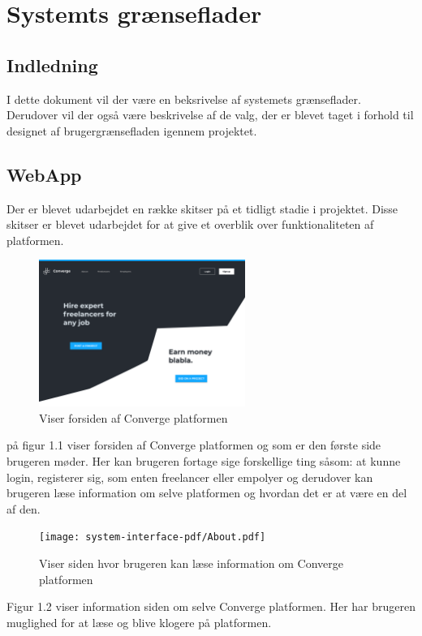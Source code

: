 \chapter{Systemts grænseflader}

\section{Indledning}
I dette dokument vil der være en beksrivelse af systemets grænseflader. 
Derudover vil der også være beskrivelse af de valg, der er blevet taget i forhold til designet af brugergrænsefladen igennem projektet. 

\section{WebApp}
Der er blevet udarbejdet en række skitser på et tidligt stadie i projektet. Disse skitser er blevet udarbejdet for at give et overblik over funktionaliteten af platformen.


\begin{figure}[ht]
    \centering
\includegraphics[width=0.6\textwidth]{system-interface-pdf/Homepage-desktop.pdf}
\caption{Viser forsiden af Converge platformen}
\label{fig:figure2}
\end{figure}

på figur 1.1 viser forsiden af Converge platformen og som er den første side brugeren møder. Her kan brugeren fortage sige forskellige ting såsom: at kunne login, registerer sig, som enten freelancer eller empolyer og derudover kan brugeren læse information om selve platformen og hvordan det er at være en del af den.   
\newpage
\begin{figure}[ht]
    \centering
\texttt{[image: system-interface-pdf/About.pdf]}
\caption{Viser siden hvor brugeren kan læse information om Converge platformen}
\label{fig:figure2}
\end{figure}

Figur 1.2 viser information siden om selve Converge platformen. Her har brugeren muglighed for at læse og blive klogere på platformen.

